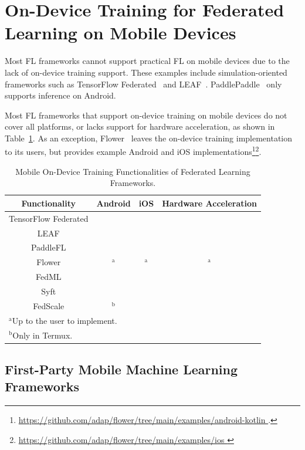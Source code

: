 \documentclass[conference]{IEEEtran}
\newcommand{\cmark}{\ding{51}}
\newcommand{\xmark}{\ding{55}}
\begin{document}
\section{On-Device Training for Federated Learning on Mobile Devices}

\label{sec:on-device}

Most FL frameworks cannot support practical FL on mobile devices due to
the lack of on-device training support.
These examples include simulation-oriented frameworks such as
TensorFlow Federated~\cite{tff,kholod2020open} and
LEAF~\cite{caldas2018leaf}.
PaddlePaddle~\cite{ma2019paddlepaddle}
only supports inference on Android.

Most FL frameworks that support on-device training on mobile devices do not
cover all platforms,
or lacks support for hardware acceleration,
as shown in Table~\ref{tab:on-device}.
As an exception,
Flower~\cite{beutel2020flower} leaves the on-device training implementation to
its users,
but provides example Android and iOS implementations\footnote{\url{
    https://github.com/adap/flower/tree/main/examples/android-kotlin
}.}\footnote{\url{
    https://github.com/adap/flower/tree/main/examples/ios
}}.


\begin{table}
\caption{Mobile On-Device Training Functionalities of
    Federated Learning Frameworks.
}
\begin{center}
\begin{tabular}{cccc}
    Functionality&Android&iOS&Hardware Acceleration\\
    \hline
    TensorFlow Federated&\xmark&\xmark&\xmark\\
    LEAF&\xmark&\xmark&\xmark\\
    PaddleFL&\xmark&\xmark&\xmark\\
    Flower&\cmark$^\mathrm{a}$&\cmark$^\mathrm{a}$&\cmark$^\mathrm{a}$\\
    FedML&\cmark&\xmark&\cmark\\
    Syft&\cmark&\cmark&\xmark\\
    FedScale&\cmark$^\mathrm{b}$&\xmark&\cmark\\
    \multicolumn{4}{l}{$^{\mathrm{a}}$Up to the user to implement.}\\
    \multicolumn{4}{l}{$^{\mathrm{b}}$Only in Termux.}
\end{tabular}
\label{tab:on-device}
\end{center}
\end{table}
\subsection{First-Party Mobile Machine Learning Frameworks}
\end{document}

